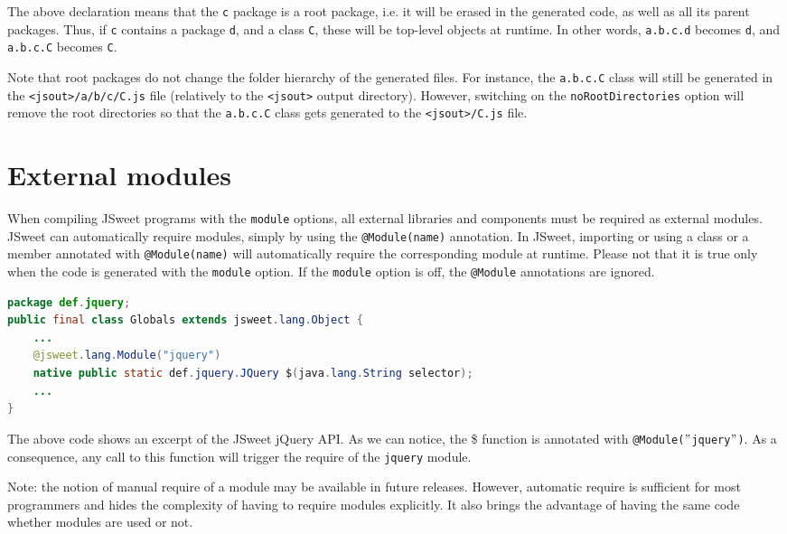 \documentclass[a4paper]{report}
\begin{document}
The above declaration means that the \texttt{c} package is a root package, i.e. it will be erased in the generated code, as well as all its parent packages. Thus, if \texttt{c} contains a package \texttt{d}, and a class \texttt{C}, these will be top-level objects at runtime. In other words, \texttt{a.b.c.d} becomes \texttt{d}, and \texttt{a.b.c.C} becomes \texttt{C}.

Note that root packages do not change the folder hierarchy of the generated files. For instance, the \texttt{a.b.c.C} class will still be generated in the \texttt{<jsout>/a/b/c/C.js} file (relatively to the \texttt{<jsout>} output directory). However, switching on the \texttt{noRootDirectories} option will remove the root directories so that the \texttt{a.b.c.C} class gets generated to the \texttt{<jsout>/C.js} file.

\section{External modules}

When compiling JSweet programs with the \texttt{module} options, all external libraries and components must be required as external modules. JSweet can automatically require modules, simply by using the \texttt{@Module(name)} annotation. In JSweet, importing or using a class or a member annotated with \texttt{@Module(name)} will automatically require the corresponding module at runtime. Please not that it is true only when the code is generated with the \texttt{module} option. If the \texttt{module} option is off, the \texttt{@Module} annotations are ignored.

\begin{lstlisting}[language=Java]
package def.jquery;
public final class Globals extends jsweet.lang.Object {
	...
	@jsweet.lang.Module("jquery")
	native public static def.jquery.JQuery $(java.lang.String selector);
	...
}
\end{lstlisting}

The above code shows an excerpt of the JSweet jQuery API. As we can notice, the \$ function is annotated with \texttt{@Module($"$jquery$"$)}. As a consequence, any call to this function will trigger the require of the \texttt{jquery} module.

Note: the notion of manual require of a module may be available in future releases. However, automatic require is sufficient for most programmers and hides the complexity of having to require modules explicitly. It also brings the advantage of having the same code whether modules are used or not.
\end{document}

